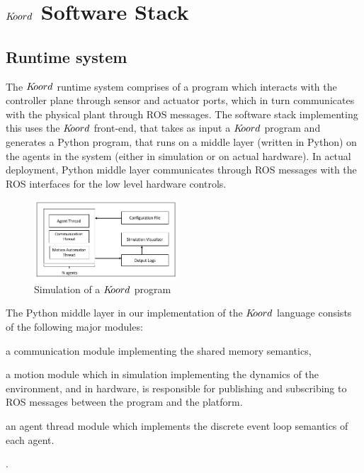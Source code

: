 \section{$K\kern-2pt oord$ Software Stack}
\label{sec:software}

\subsection{Runtime system}
 The $K\kern-2pt oord$ runtime system comprises of a program which interacts with the controller plane through sensor and actuator ports, which in turn communicates with the physical plant through ROS messages. The software stack implementing this uses the $K\kern-2pt oord$ front-end, that takes as input a $K\kern-2pt oord$ program and generates a Python program, that runs on a middle layer (written in Python) on the agents in the system (either in simulation or on actual hardware). In actual deployment, Python middle layer communicates through ROS messages with the ROS interfaces for the low level hardware controls. 

\begin{figure}[h!]
\centering
\includegraphics[width=0.48\textwidth]{figs/simulationengine.png}
\caption{Simulation of a $K\kern-2pt oord$ program }
\label{fig:simfig}
\end{figure}
The Python middle layer in our implementation of the $K\kern-2pt oord$ language consists of the following major modules:\begin{inparaenum}
\item a communication module implementing the shared memory semantics,
\item a motion module which in simulation implementing the dynamics of the environment, and in hardware, is responsible for publishing and subscribing to ROS messages between the program and the platform. 
\item an agent thread module which implements the discrete event loop semantics of each agent. 
\end{inparaenum}. 

